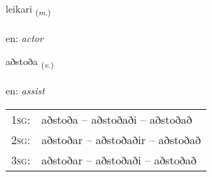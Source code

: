 \documentclass[frontgrid, backgrid]{flacards}\usepackage[]{graphicx}\usepackage[]{color}
\begin{document}
\renewcommand{\flhead}{\vskip5pt \fboxsep=0pt {\small\bfseries\footnotesize Nafnorð | Noun}}
\renewcommand{\fcfoot}{\vskip5pt \fboxsep=0pt \hspace{2pt}{\small\bfseries\footnotesize 2K}}

\renewcommand{\blhead}{\vskip5pt {\small\bfseries\footnotesize Nafnorð | Noun }}
\renewcommand{\bcfoot}{\vskip5pt \hspace{2pt}{\small\bfseries\footnotesize 2K}}


{leikari \small{\textsubscript{(\textit{m.})}} \\[1ex] %
\textphonetic{[leiːkarɪ]} \\
en: \emph{actor} \\  [2ex]
\renewcommand*{\arraystretch}{0.8}
}

\renewcommand{\flhead}{\vskip5pt \fboxsep=0pt {\small\bfseries\footnotesize Sagnorð | Verb}}
\renewcommand{\fcfoot}{\vskip5pt \fboxsep=0pt \hspace{2pt}{\small\bfseries\footnotesize 2K}}

\renewcommand{\blhead}{\vskip5pt {\small\bfseries\footnotesize Sagnorð | Verb }}
\renewcommand{\bcfoot}{\vskip5pt \hspace{2pt}{\small\bfseries\footnotesize 2K}}


{aðstoða \small{\textsubscript{(\textit{v.})}} \\[1ex] %
\textphonetic{[aðstɔða]} \\
en: \emph{assist} \\  [2ex]
\renewcommand*{\arraystretch}{0.8}
\begin{tabular}{p{1cm}l}
\textsc{1sg}: & aðstoða -- aðstoðaði -- aðstoðað \\ 
\textsc{2sg}: & aðstoðar -- aðstoðaðir -- aðstoðað \\ 
\textsc{3sg}: & aðstoðar -- aðstoðaði -- aðstoðað \\ 
\end{tabular}
}
\end{document}
